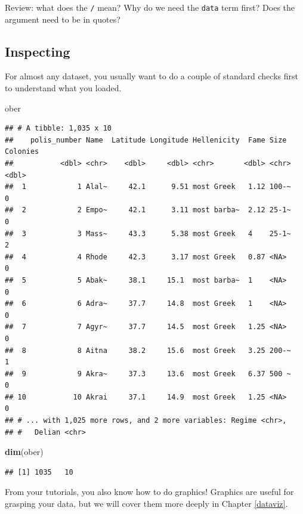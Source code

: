 \documentclass[]{book}
\newenvironment{Shaded}{\begin{snugshade}}{\end{snugshade}}
\newcommand{\KeywordTok}[1]{\textcolor[rgb]{0.13,0.29,0.53}{\textbf{#1}}}
\newcommand{\NormalTok}[1]{#1}
\theoremstyle{definition}
\theoremstyle{definition}
\theoremstyle{definition}
\theoremstyle{remark}
\begin{document}
Review: what does the \texttt{/} mean? Why do we need the \texttt{data}
term first? Does the argument need to be in quotes?

\subsection{Inspecting}\label{inspecting}

For almost any dataset, you usually want to do a couple of standard
checks first to understand what you loaded.

\begin{Shaded}
\begin{Highlighting}[]
\NormalTok{ober}
\end{Highlighting}
\end{Shaded}

\begin{verbatim}
## # A tibble: 1,035 x 10
##    polis_number Name  Latitude Longitude Hellenicity  Fame Size  Colonies
##           <dbl> <chr>    <dbl>     <dbl> <chr>       <dbl> <chr>    <dbl>
##  1            1 Alal~     42.1      9.51 most Greek   1.12 100-~        0
##  2            2 Empo~     42.1      3.11 most barba~  2.12 25-1~        0
##  3            3 Mass~     43.3      5.38 most Greek   4    25-1~        2
##  4            4 Rhode     42.3      3.17 most Greek   0.87 <NA>         0
##  5            5 Abak~     38.1     15.1  most barba~  1    <NA>         0
##  6            6 Adra~     37.7     14.8  most Greek   1    <NA>         0
##  7            7 Agyr~     37.7     14.5  most Greek   1.25 <NA>         0
##  8            8 Aitna     38.2     15.6  most Greek   3.25 200-~        1
##  9            9 Akra~     37.3     13.6  most Greek   6.37 500 ~        0
## 10           10 Akrai     37.1     14.9  most Greek   1.25 <NA>         0
## # ... with 1,025 more rows, and 2 more variables: Regime <chr>,
## #   Delian <chr>
\end{verbatim}

\begin{Shaded}
\begin{Highlighting}[]
\KeywordTok{dim}\NormalTok{(ober)}
\end{Highlighting}
\end{Shaded}

\begin{verbatim}
## [1] 1035   10
\end{verbatim}

From your tutorials, you also know how to do graphics! Graphics are
useful for grasping your data, but we will cover them more deeply in
Chapter \ref{dataviz}.
\end{document}
